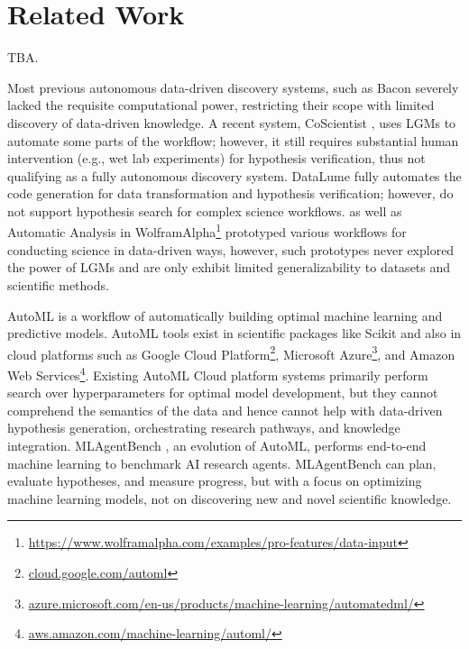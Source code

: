\section{Related Work }
\label{sec:related_work}

\cite{majumder2024data}
TBA.

Most previous autonomous data-driven discovery systems, such as Bacon \citep{Langley1981DataDrivenDO, Langley1984TheSF, Langley1983RediscoveringCW} severely lacked the requisite computational power, restricting their scope with limited discovery of data-driven knowledge. A recent system, CoScientist \citet{Boiko2023AutonomousCR}, uses LGMs to automate some parts of the workflow; however, it still requires substantial human intervention (e.g., wet lab experiments) for hypothesis verification, thus not qualifying as a fully autonomous discovery system. DataLume \cite{Gu2023HowDD} fully automates the code generation for data transformation and hypothesis verification; however, do not support hypothesis search for complex science workflows. \citet{Gil2022TowardsCS, Gil2017TowardsCS, Gil2013UsingSW} as well as Automatic Analysis in WolframAlpha\footnote{\url{https://www.wolframalpha.com/examples/pro-features/data-input}} prototyped various workflows for conducting science in data-driven ways, however, such prototypes never explored the power of LGMs and are only exhibit limited generalizability to datasets and scientific methods. 


AutoML is a workflow of automatically building optimal machine learning and predictive models. AutoML tools exist in scientific packages like Scikit \cite{feurer2015efficient} and also in cloud platforms such as Google Cloud Platform\footnote{\url{cloud.google.com/automl}}, Microsoft Azure\footnote{\url{azure.microsoft.com/en-us/products/machine-learning/automatedml/}}, and Amazon Web Services\footnote{\url{aws.amazon.com/machine-learning/automl/}}. Existing AutoML Cloud platform systems primarily
perform search over hyperparameters for optimal model development, but they cannot comprehend the semantics of the data and hence cannot help with data-driven hypothesis generation, orchestrating research pathways, and knowledge integration. MLAgentBench \cite{Huang2023BenchmarkingLL}, an evolution of AutoML, performs end-to-end machine learning to benchmark AI research agents. MLAgentBench can plan, evaluate hypotheses, and measure progress, but with a focus on optimizing machine learning models, not on discovering new and novel scientific knowledge.


